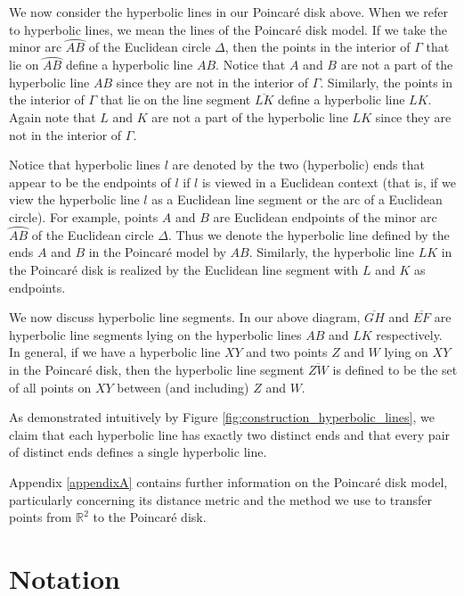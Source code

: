 \documentclass[12pt]{article}
\newcommand{\R}{\mathbb{R}}
\newcommand{\poincare}{Poincar\'{e} }
\theoremstyle{plain}
\theoremstyle{definition}
\begin{document}
We now consider the hyperbolic lines in our \poincare disk above. When we refer to hyperbolic lines, we mean the lines of the \poincare disk model. If we take the minor arc $\wideparen{AB}$ of the Euclidean circle $\Delta$, then the points in the interior of $\Gamma$ that lie on $\wideparen{AB}$ define a hyperbolic line $AB$. Notice that $A$ and $B$ are not a part of the hyperbolic line $AB$ since they are not in the interior of $\Gamma$. Similarly, the points in the interior of $\Gamma$ that lie on the line segment $\overline{LK}$ define a hyperbolic line $LK$. Again note that $L$ and $K$ are not a part of the hyperbolic line $LK$ since they are not in the interior of $\Gamma$. 

Notice that hyperbolic lines $l$ are denoted by the two (hyperbolic) ends that appear to be the endpoints of $l$ if $l$ is viewed in a Euclidean context (that is, if we view the hyperbolic line $l$ as a Euclidean line segment or the arc of a Euclidean circle). For example, points $A$ and $B$ are Euclidean endpoints of the minor arc $\wideparen{AB}$ of the Euclidean circle $\Delta$. Thus we denote the hyperbolic line defined by the ends $A$ and $B$ in the \poincare model by $AB$. Similarly, the hyperbolic line $LK$ in the \poincare disk is realized by the Euclidean line segment with $L$ and $K$ as endpoints. 

We now discuss hyperbolic line segments. In our above diagram, $\overline{GH}$ and $\overline{EF}$ are hyperbolic line segments lying on the hyperbolic lines $AB$ and $LK$ respectively. In general, if we have a hyperbolic line $XY$ and two points $Z$ and $W$ lying on $XY$ in the \poincare disk, then the hyperbolic line segment $\overline{ZW}$ is defined to be the set of all points on $XY$ between (and including) $Z$ and $W$.

As demonstrated intuitively by Figure \ref{fig:construction_hyperbolic_lines}, we claim that each hyperbolic line has exactly two distinct ends and that every pair of distinct ends defines a single hyperbolic line.

Appendix \ref{appendixA} contains further information on the \poincare disk model, particularly concerning its distance metric and the method we use to transfer points from $\R^2$ to the \poincare disk. 

\section{Notation}
	
\end{document}
